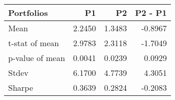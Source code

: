 \begin{tabular}{lrrr}
\toprule
Portfolios & P1 & P2 & P2 - P1 \\
\midrule
Mean & 2.2450 & 1.3483 & -0.8967 \\
t-stat of mean & 2.9783 & 2.3118 & -1.7049 \\
p-value of mean & 0.0041 & 0.0239 & 0.0929 \\
Stdev & 6.1700 & 4.7739 & 4.3051 \\
Sharpe & 0.3639 & 0.2824 & -0.2083 \\
\bottomrule
\end{tabular}
